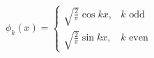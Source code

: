 $
  \phi_k(x) =
  \begin{cases}
  \sqrt{\frac{2}{\pi}} \cos{kx}, & k \text{ odd}\\
  \sqrt{\frac{2}{\pi}} \sin{kx}, & k \text{ even}
  \end{cases}
$
